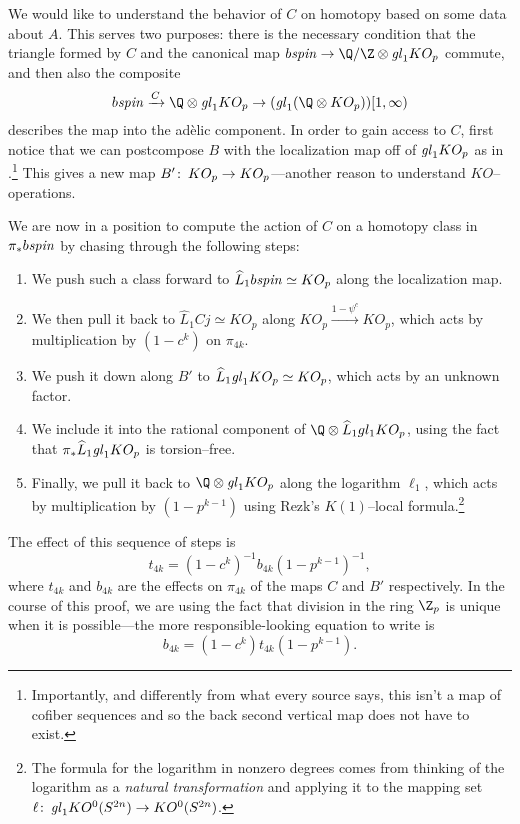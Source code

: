 We would like to understand the behavior of $C$ on homotopy based on some data about $A$.  This serves two purposes: there is the necessary condition that the triangle formed by $C$ and the canonical map $b\spin \to \Q / \Z \otimes \gl_1 KO_p$ commute, and then also the composite \[b\spin \xrightarrow{C} \Q \otimes \gl_1 KO_p \to (\gl_1 (\Q \otimes KO_p))[1, \infty)\] describes the map into the ad\`elic component.  In order to gain access to $C$, first notice that we can postcompose $B$ with the localization map off of $\mathit{gl}_1 KO_p$ as in .\footnote{Importantly, and differently from what every source says, this isn't a map of cofiber sequences and so the back second vertical map does not have to exist.}  This gives a new map $B'\colon\thinspace KO_p \to KO_p$---another reason to understand $KO$--operations.

We are now in a position to compute the action of $C$ on a homotopy class in $\pi_* b\mathit{spin}$ by chasing through the following steps:
\begin{enumerate}
    \item We push such a class forward to $\widehat L_1 b\mathit{spin} \simeq KO_p$ along the localization map.
    \item We then pull it back to $\widehat L_1 Cj \simeq KO_p$ along $KO_p \xrightarrow{1 - \psi^c} KO_p$, which acts by multiplication by $(1 - c^k)$ on $\pi_{4k}$.
    \item We push it down along $B'$ to $\widehat L_1 \mathit{gl}_1 KO_p \simeq KO_p$, which acts by an unknown factor.
    \item We include it into the rational component of $\Q \otimes \widehat L_1 gl_1 KO_p$, using the fact that $\pi_* \widehat L_1 \mathit{gl}_1 KO_p$ is torsion--free.
    \item Finally, we pull it back to $\Q \otimes \gl_1 KO_p$ along the logarithm $\ell_1$, which acts by multiplication by $(1 - p^{k-1})$ using Rezk's $K(1)$--local formula.\footnote{The formula for the logarithm in nonzero degrees comes from thinking of the logarithm as a \emph{natural transformation} and applying it to the mapping set $\ell\colon\thinspace \mathit{gl}_1 KO^0(S^{2n}) \to KO^0(S^{2n})$.}
\end{enumerate}
The effect of this sequence of steps is \[t_{4k} = (1 - c^k)^{-1} b_{4k} (1 - p^{k-1})^{-1},\] where $t_{4k}$ and $b_{4k}$ are the effects on $\pi_{4k}$ of the maps $C$ and $B'$ respectively.  In the course of this proof, we are using the fact that division in the ring $\Z_p$ is unique when it is possible---the more responsible-looking equation to write is \[b_{4k} = (1 - c^k) t_{4k} (1 - p^{k-1}).\]

